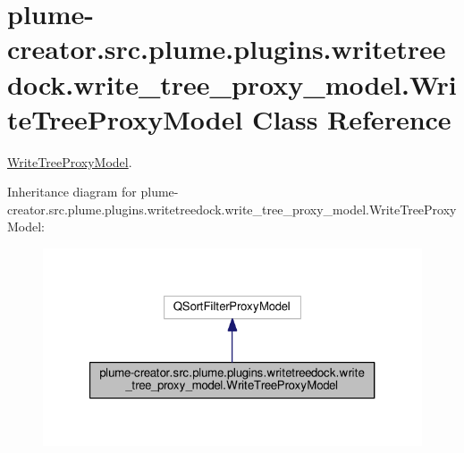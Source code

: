 \hypertarget{classplume-creator_1_1src_1_1plume_1_1plugins_1_1writetreedock_1_1write__tree__proxy__model_1_1_write_tree_proxy_model}{}\section{plume-\/creator.src.\+plume.\+plugins.\+writetreedock.\+write\+\_\+tree\+\_\+proxy\+\_\+model.\+Write\+Tree\+Proxy\+Model Class Reference}
\label{classplume-creator_1_1src_1_1plume_1_1plugins_1_1writetreedock_1_1write__tree__proxy__model_1_1_write_tree_proxy_model}


\hyperlink{classplume-creator_1_1src_1_1plume_1_1plugins_1_1writetreedock_1_1write__tree__proxy__model_1_1_write_tree_proxy_model}{Write\+Tree\+Proxy\+Model}.  




Inheritance diagram for plume-\/creator.src.\+plume.\+plugins.\+writetreedock.\+write\+\_\+tree\+\_\+proxy\+\_\+model.\+Write\+Tree\+Proxy\+Model\+:\nopagebreak
\begin{figure}[H]
\begin{center}
\leavevmode
\includegraphics[width=321pt]{classplume-creator_1_1src_1_1plume_1_1plugins_1_1writetreedock_1_1write__tree__proxy__model_1_1_27c08667a1b9f36f0a4d1f32d73f88ab}
\end{center}
\end{figure}


